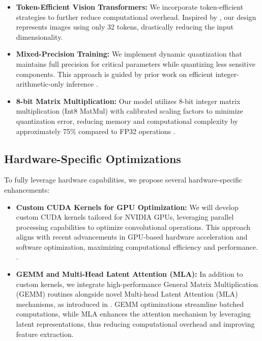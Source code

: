 \documentclass[11pt, oneside]{article}   	%
\begin{document}
\begin{itemize}
    \item \textbf{Token-Efficient Vision Transformers:} We incorporate token-efficient strategies to further reduce computational overhead. Inspired by \cite{yu2024imageworth32tokens}, our design represents images using only 32 tokens, drastically reducing the input dimensionality.
    
	\item \textbf{Mixed-Precision Training:} We implement dynamic quantization that maintains full precision for critical parameters while quantizing less sensitive components. This approach is guided by prior work on efficient integer-arithmetic-only inference \cite{jacob2017quantizationtrainingneuralnetworks}.
	
	\item \textbf{8-bit Matrix Multiplication:} Our model utilizes 8-bit integer matrix multiplication (Int8 MatMul) with calibrated scaling factors to minimize quantization error, reducing memory and computational complexity by approximately 75\% compared to FP32 operations \cite{jacob2017quantizationtrainingneuralnetworks}.
	
	
\end{itemize}

\subsection*{Hardware-Specific Optimizations}

To fully leverage hardware capabilities, we propose several hardware-specific enhancements:

\begin{itemize}
	\item \textbf{Custom CUDA Kernels for GPU Optimization:} We will develop custom CUDA kernels tailored for NVIDIA GPUs, leveraging parallel processing capabilities to optimize convolutional operations. This approach aligns with recent advancements in GPU-based hardware acceleration and software optimization, maximizing computational efficiency and performance. \cite{deepseekai2025deepseekv3technicalreport}.
	
	\item \textbf{GEMM and Multi-Head Latent Attention (MLA):} In addition to custom kernels, we integrate high-performance General Matrix Multiplication (GEMM) routines alongside novel Multi-head Latent Attention (MLA) mechanisms, as introduced in \cite{deepseekai2025deepseekv3technicalreport}. GEMM optimizations streamline batched computations, while MLA enhances the attention mechanism by leveraging latent representations, thus reducing computational overhead and improving feature extraction.
	
\end{itemize}
\end{document}
